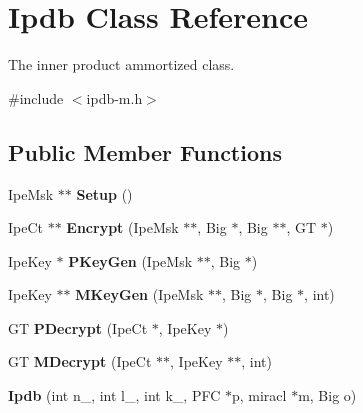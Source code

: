 \hypertarget{classIpdb}{}\section{Ipdb Class Reference}
\label{classIpdb}


The inner product ammortized class.  




{\ttfamily \#include $<$ipdb-\/m.\+h$>$}

\subsection*{Public Member Functions}
\begin{DoxyCompactItemize}
\item 
Ipe\+Msk $\ast$$\ast$ {\bfseries Setup} ()\hypertarget{classIpdb_a536a77dfa585af86dcda04ce54729481}{}\label{classIpdb_a536a77dfa585af86dcda04ce54729481}

\item 
Ipe\+Ct $\ast$$\ast$ {\bfseries Encrypt} (Ipe\+Msk $\ast$$\ast$, Big $\ast$, Big $\ast$$\ast$, GT $\ast$)\hypertarget{classIpdb_a5cc54a99bd6def6df87d42577004a334}{}\label{classIpdb_a5cc54a99bd6def6df87d42577004a334}

\item 
Ipe\+Key $\ast$ {\bfseries P\+Key\+Gen} (Ipe\+Msk $\ast$$\ast$, Big $\ast$)\hypertarget{classIpdb_a8ae642b00bf1af0e651373aca8cb36eb}{}\label{classIpdb_a8ae642b00bf1af0e651373aca8cb36eb}

\item 
Ipe\+Key $\ast$$\ast$ {\bfseries M\+Key\+Gen} (Ipe\+Msk $\ast$$\ast$, Big $\ast$, Big $\ast$, int)\hypertarget{classIpdb_a3d07c53866927028d0dbee4a65f9130b}{}\label{classIpdb_a3d07c53866927028d0dbee4a65f9130b}

\item 
GT {\bfseries P\+Decrypt} (Ipe\+Ct $\ast$, Ipe\+Key $\ast$)\hypertarget{classIpdb_a791f8e59c6fe1009d4bb8fc8c59675f6}{}\label{classIpdb_a791f8e59c6fe1009d4bb8fc8c59675f6}

\item 
GT {\bfseries M\+Decrypt} (Ipe\+Ct $\ast$$\ast$, Ipe\+Key $\ast$$\ast$, int)\hypertarget{classIpdb_af3ea6b414a1273a68e563176b0456d02}{}\label{classIpdb_af3ea6b414a1273a68e563176b0456d02}

\item 
{\bfseries Ipdb} (int n\+\_\+, int l\+\_\+, int k\+\_\+, P\+FC $\ast$p, miracl $\ast$m, Big o)\hypertarget{classIpdb_af211f93d19bfc4b6656989b608aec11e}{}\label{classIpdb_af211f93d19bfc4b6656989b608aec11e}

\end{DoxyCompactItemize}
